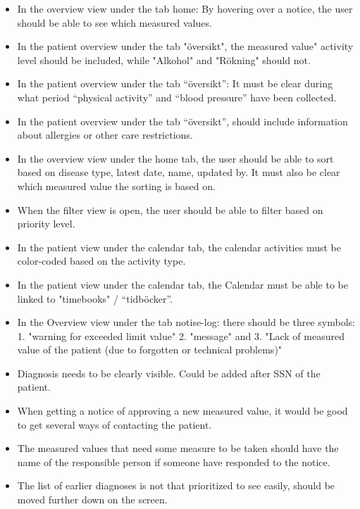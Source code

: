 \documentclass{article}
\begin{document}
	\begin{itemize}
		\item In the overview view under the tab home: By hovering over a notice, the user should be able to see which measured values. 
		
		\item In the patient overview under the tab "översikt", the measured value" activity level should be included, while "Alkohol" and "Rökning" should not.
		
		\item In the patient overview under the tab “översikt”: It must be clear during what period “physical activity” and “blood pressure” have been collected. 
		
		\item In the patient overview under the tab “översikt”, should include information about allergies or other care restrictions. 
		
		\item In the overview view under the home tab, the user should be able to sort based on disease type, latest date, name, updated by. It must also be clear which measured value the sorting is based on. 
		
		\item When the filter view is open, the user should be able to filter based on priority level. 
		
		\item In the patient view under the calendar tab, the calendar activities must be color-coded based on the activity type. 
		
		\item In the patient view under the calendar tab, the Calendar must be able to be linked to "timebooks" / “tidböcker”. 
		
		\item In the Overview view under the tab notise-log: there should be three symbols: 1. "warning for exceeded limit value" 2. "message" and 3. "Lack of measured value of the patient (due to forgotten or technical problems)" 

		\item Diagnosis needs to be clearly visible. Could be added after SSN of the patient.
		\item When getting a notice of approving a new measured value, it would be good to get several ways of contacting the patient.
		
		\item The measured values that need some measure to be taken should have the name of the responsible person if someone have responded to the notice.
		
		\item The list of earlier diagnoses is not that prioritized to see easily, should be moved further down on the screen.
	\end{itemize}
	
\end{document}
